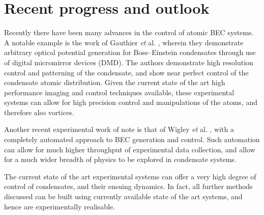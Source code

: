 \section{Recent progress and outlook}
Recently there have been many advances in the control of atomic BEC systems. A notable example is the work of Gauthier \textit{et} al. \cite{BEC:Gauthier_arxiv_2016}, wherein they demonstrate arbitrary optical potential generation for Bose--Einstein condensates through use of digital micromirror devices (DMD). The authors demonstrate high resolution control and patterning of the condensate, and show near perfect control of the condensate atomic distribution. Given the current state of the art high performance imaging and control techniques available, these experimental systems can allow for high precision control and manipulations of the atoms, and therefore also vortices.

Another recent experimental work of note is that of Wigley \textit{et} al. \cite{BEC:Wigley_scirep_2016}, with a completely automated approach to BEC generation and control. Such automation can allow for much higher throughput of experimental data collection, and allow for a much wider breadth of physics to be explored in condensate systems.

The current state of the art experimental systems can offer a very high degree of control of condensates, and their ensuing dynamics. In fact, all further methods discussed can be built using currently available state of the art systems, and hence are experimentally realisable.
